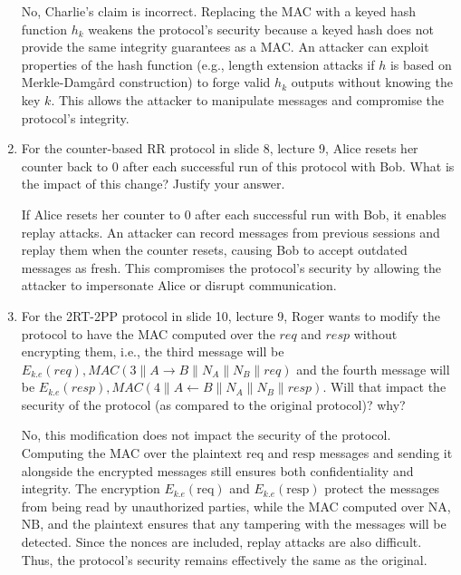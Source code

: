 \documentclass[12pt]{article}
\newcommand*\concat{\mathbin{\|}}
\begin{document}
\begin{enumerate}
    No, Charlie's claim is incorrect. Replacing the MAC with a keyed hash function $h_k$ weakens the protocol's security because a keyed hash does not provide the same integrity guarantees as a MAC. An attacker can exploit properties of the hash function (e.g., length extension attacks if $h$ is based on Merkle-Damgård construction) to forge valid $h_k$ outputs without knowing the key $k$. This allows the attacker to manipulate messages and compromise the protocol's integrity.

    \item For the counter-based RR protocol in slide 8, lecture 9, Alice resets her counter back to 0 after each successful run of this protocol with Bob. What is the impact of this change? Justify your answer. \newline

    If Alice resets her counter to 0 after each successful run with Bob, it enables replay attacks. An attacker can record messages from previous sessions and replay them when the counter resets, causing Bob to accept outdated messages as fresh. This compromises the protocol's security by allowing the attacker to impersonate Alice or disrupt communication.


    \item For the 2RT-2PP protocol in slide 10, lecture 9, Roger wants to modify the protocol to have the MAC computed over the $req$ and $resp$ without encrypting them, i.e., the third message will be $E_{k.e} (req), MAC(3 \concat A\rightarrow B \concat  N_A \concat N_B \concat req)$ and the fourth message will be $E_{k.e} (resp), MAC(4 \concat A\leftarrow B \concat  N_A \concat N_B \concat resp)$. Will that impact the security of the protocol (as compared to the original protocol)? why? \newline

    No, this modification does not impact the security of the protocol. Computing the MAC over the plaintext \( \text{req} \) and \( \text{resp} \) messages and sending it alongside the encrypted messages still ensures both confidentiality and integrity. The encryption \( E_{k.e}(\text{req}) \) and \( E_{k.e}(\text{resp}) \) protect the messages from being read by unauthorized parties, while the MAC computed over \( \text{NA} \), \( \text{NB} \), and the plaintext ensures that any tampering with the messages will be detected. Since the nonces are included, replay attacks are also difficult. Thus, the protocol's security remains effectively the same as the original.

\end{enumerate}
\end{document}
